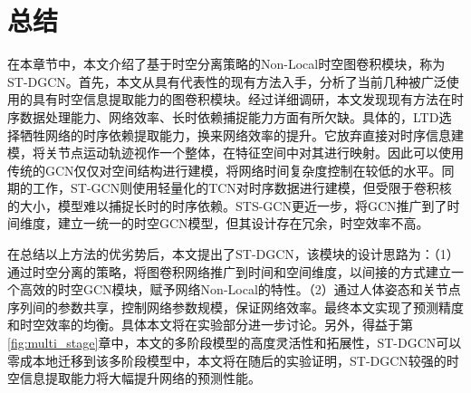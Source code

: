 \section{总结}
在本章节中，本文介绍了基于时空分离策略的Non-Local时空图卷积模块，称为ST-DGCN。首先，本文从具有代表性的现有方法入手，分析了当前几种被广泛使用的具有时空信息提取能力的图卷积模块。经过详细调研，本文发现现有方法在时序数据处理能力、网络效率、长时依赖捕捉能力方面有所欠缺。具体的，LTD\parencite{mao2019learning}选择牺牲网络的时序依赖提取能力，换来网络效率的提升。它放弃直接对时序信息建模，将关节点运动轨迹视作一个整体，在特征空间中对其进行映射。因此可以使用传统的GCN仅仅对空间结构进行建模，将网络时间复杂度控制在较低的水平。同期的工作，ST-GCN\parencite{yan2018spatial}则使用轻量化的TCN对时序数据进行建模，但受限于卷积核的大小，模型难以捕捉长时的时序依赖。STS-GCN更近一步，将GCN推广到了时间维度，建立一统一的时空GCN模型，但其设计存在冗余，时空效率不高。

在总结以上方法的优劣势后，本文提出了ST-DGCN，该模块的设计思路为：（1）通过时空分离的策略，将图卷积网络推广到时间和空间维度，以间接的方式建立一个高效的时空GCN模块，赋予网络Non-Local的特性。（2）通过人体姿态和关节点序列间的参数共享，控制网络参数规模，保证网络效率。最终本文实现了预测精度和时空效率的均衡。具体本文将在实验部分进一步讨论。另外，得益于第\ref{fig:multi_stage}章中，本文的多阶段模型的高度灵活性和拓展性，ST-DGCN可以零成本地迁移到该多阶段模型中，本文将在随后的实验证明，ST-DGCN较强的时空信息提取能力将大幅提升网络的预测性能。
